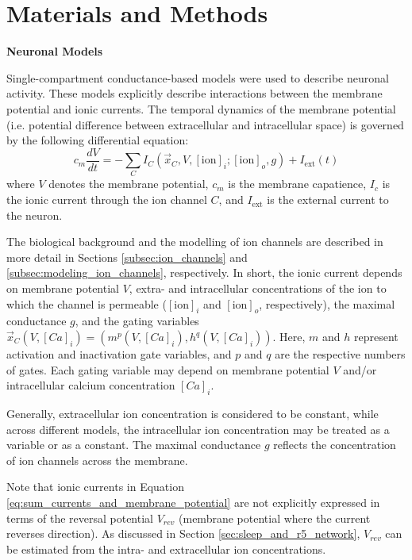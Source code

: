 \documentclass[../main.tex]{subfiles}
\begin{document}
\section{Materials and Methods} \label{sec:materials_and_methods}

\noindent\textbf{Neuronal Models}

Single-compartment conductance-based models were used to describe neuronal activity. These models explicitly describe
interactions between the membrane potential and ionic currents. The temporal dynamics of the membrane potential (i.e. potential difference between extracellular and intracellular space) is governed by the following differential equation:
\begin{equation}\label{eq:sum_currents_and_membrane_potential}
    c_m\frac{dV}{dt} = -\sum_{C} I_{C}(\vec{x}_C, V, [\text{ion}]_i; [\text{ion}]_o, g) + I_{\text{ext}}(t)
\end{equation}
where $V$ denotes the membrane potential, $c_m$ is the membrane capatience, $I_c$ is the ionic current through the ion channel $C$, and $I_{\text{ext}}$ is the external current to the neuron.

The biological background and the modelling of ion channels are described in more detail in Sections \ref{subsec:ion_channels} and \ref{subsec:modeling_ion_channels}, respectively. In short,
the ionic current depends on membrane potential $V$, extra- and intracellular concentrations of the ion to which the channel is permeable ($[\text{ion}]_i$ and $[\text{ion}]_o$, respectively), the maximal conductance $g$, and the gating variables $\vec{x}_C(V,[Ca]_i)=(m^p(V,[Ca]_i),h^q(V,[Ca]_i))$. Here, $m$ and $h$ represent activation and inactivation gate variables, and $p$ and $q$ are the respective numbers of gates. Each gating variable may depend on membrane potential $V$ and/or intracellular calcium concentration $[Ca]_i$. 

Generally, extracellular ion concentration is considered to be constant, while across different models, the intracellular ion concentration may be treated as a variable or as a constant. The maximal conductance $g$ reflects the concentration of ion channels across the membrane. 

Note that ionic currents in Equation \ref{eq:sum_currents_and_membrane_potential} are not explicitly expressed in terms of the reversal potential $V_{rev}$ (membrane potential where the current reverses direction). As discussed in Section \ref{sec:sleep_and_r5_network}, $V_{rev}$ can be estimated from the intra- and extracellular ion concentrations.
\end{document}
